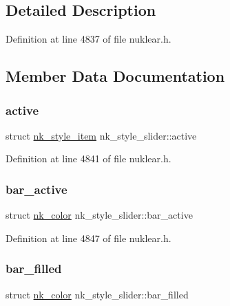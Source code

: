 \subsection{Detailed Description}


Definition at line 4837 of file nuklear.\+h.



\subsection{Member Data Documentation}
\mbox{\label{structnk__style__slider_a9f85ea5ee0d952cc5d1e8dfcf06d09b6}} 
\subsubsection{\texorpdfstring{active}{active}}
{\footnotesize\ttfamily struct \mbox{\hyperlink{structnk__style__item}{nk\+\_\+style\+\_\+item}} nk\+\_\+style\+\_\+slider\+::active}



Definition at line 4841 of file nuklear.\+h.

\mbox{\label{structnk__style__slider_a4234c3fd7dd2300c4c27d499eea7eb62}} 
\subsubsection{\texorpdfstring{bar\+\_\+active}{bar\_active}}
{\footnotesize\ttfamily struct \mbox{\hyperlink{structnk__color}{nk\+\_\+color}} nk\+\_\+style\+\_\+slider\+::bar\+\_\+active}



Definition at line 4847 of file nuklear.\+h.

\mbox{\label{structnk__style__slider_aa0771bad7fb36018adad50913744dc34}} 
\subsubsection{\texorpdfstring{bar\+\_\+filled}{bar\_filled}}
{\footnotesize\ttfamily struct \mbox{\hyperlink{structnk__color}{nk\+\_\+color}} nk\+\_\+style\+\_\+slider\+::bar\+\_\+filled}




